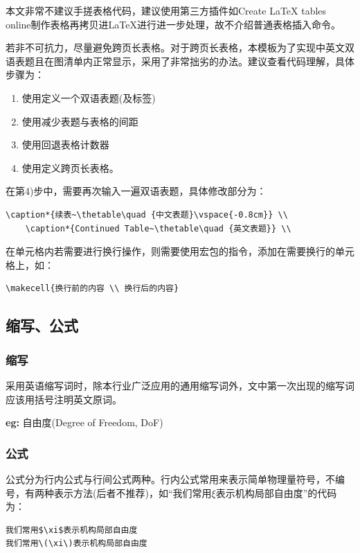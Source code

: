 本文非常不建议手搓表格代码，建议使用第三方插件如Create LaTeX tables online\cite{TabCreateLaTeXta}制作表格再拷贝进\LaTeX{}进行进一步处理，故不介绍普通表格插入命令。

若非不可抗力，尽量避免跨页长表格。对于跨页长表格，本模板为了实现中英文双语表题且在图清单内正常显示，采用了非常拙劣的办法。建议查看代码理解，具体步骤为：
\begin{enumerate}
    \item 使用定义一个双语表题(及标签)
    \item 使用减少表题与表格的间距
    \item 使用回退表格计数器
    \item 使用定义跨页长表格。
\end{enumerate}
在第4)步中，需要再次输入一遍双语表题，具体修改部分为：

\begin{lstlisting}[language={[LaTeX]TeX}]
    \caption*{续表~\thetable\quad {中文表题}\vspace{-0.8cm}} \\
    \caption*{Continued Table~\thetable\quad {英文表题}} \\
\end{lstlisting}

在单元格内若需要进行换行操作，则需要使用宏包的指令，添加在需要换行的单元格上，如：

\begin{lstlisting}[language={[LaTeX]TeX}]
    \makecell{换行前的内容 \\ 换行后的内容}
\end{lstlisting}

\subsection{缩写、公式}

\subsubsection{缩写}
采用英语缩写词时，除本行业广泛应用的通用缩写词外，文中第一次出现的缩写词应该用括号注明英文原词。

\textbf{eg:} 自由度(Degree of Freedom, DoF)

\subsubsection{公式}
公式分为行内公式与行间公式两种。行内公式常用来表示简单物理量符号，不编号，有两种表示方法(后者不推荐)，如“我们常用$\xi$表示机构局部自由度”的代码为：
\begin{lstlisting}[language={[LaTeX]TeX}]
我们常用$\xi$表示机构局部自由度
我们常用\(\xi\)表示机构局部自由度
\end{lstlisting}


